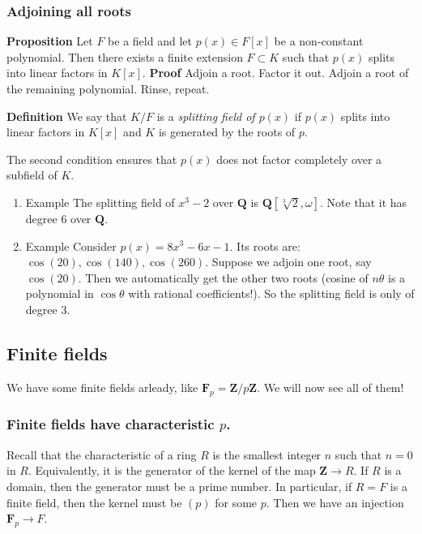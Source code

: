 \documentclass[11pt]{article}
\begin{document}
\subsubsection{Adjoining all roots}
\label{sec:org414e9de}
\textbf{\textbf{Proposition}} Let \(F\) be a field and let \(p(x) \in F[x]\) be a non-constant polynomial.
Then there exists a finite extension \(F \subset K\) such that \(p(x)\) splits into linear factors in \(K[x]\).
\textbf{\textbf{Proof}} Adjoin a root.  Factor it out. Adjoin a root of the remaining polynomial.  Rinse, repeat.

\textbf{\textbf{Definition}} We say that \(K/F\) is a \emph{splitting field of \(p(x)\)} if \(p(x)\) splits into linear factors in \(K[x]\) and \(K\) is generated by the roots of \(p\).

The second condition ensures that \(p(x)\) does not factor completely over a subfield of \(K\).
\begin{enumerate}
\item Example
\label{sec:org5a5fa89}
The splitting field of \(x^3-2\) over \(\mathbf{Q}\) is \(\mathbf{Q}[\sqrt[3]{2}, \omega]\).
Note that it has degree 6 over \(\mathbf{Q}\).
\item Example
\label{sec:org40c6cdb}
Consider \(p(x) = 8x^3-6x-1\).
Its roots are: \(\cos(20), \cos(140), \cos(260)\).
Suppose we adjoin one root, say \(\cos(20)\).
Then we automatically get the other two roots (cosine of \(n\theta\) is a polynomial in \(\cos \theta\) with rational coefficients!).
So the splitting field is only of degree 3.
\end{enumerate}
\subsection{Finite fields}
\label{sec:orga9e4e13}
We have some finite fields arleady, like \(\mathbf{F}_p = \mathbf{Z} / p \mathbf{Z}\).
We will now see all of them!
\subsubsection{Finite fields have characteristic \(p\).}
\label{sec:orge7b6061}
Recall that the characteristic of a ring \(R\) is the smallest integer \(n\) such that \(n = 0\) in \(R\).
Equivalently, it is the generator of the kernel of the map \(\mathbf{Z} \to R\).
If \(R\) is a domain, then the generator must be a prime number.
In particular, if \(R = F\) is a finite field, then the kernel must be \((p)\) for some \(p\).
Then we have an injection \(\mathbf{F}_p \to F\).
\end{document}
